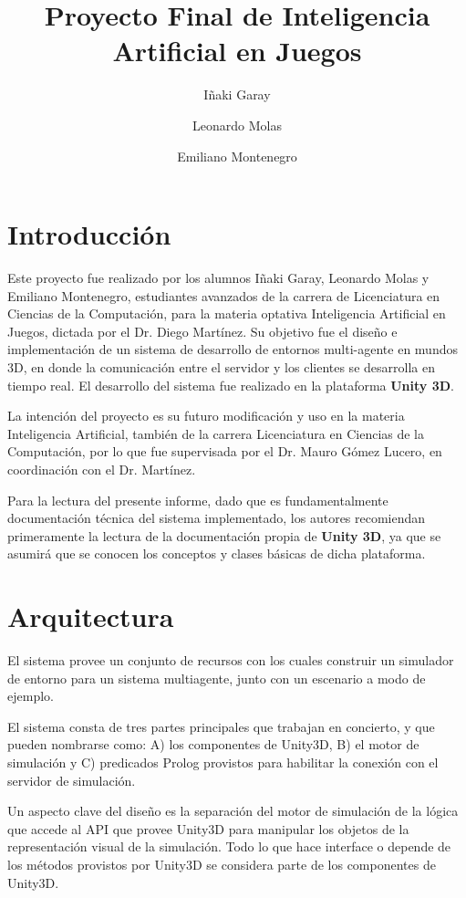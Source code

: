 \documentclass[a4paper,oneside]{article}
\title{Proyecto Final de Inteligencia Artificial en Juegos}
\author{Iñaki Garay \and Leonardo Molas \and Emiliano Montenegro}
\begin{document}
\maketitle

\section{Introducción}

Este proyecto fue realizado por los alumnos Iñaki Garay, Leonardo Molas
y Emiliano Montenegro, estudiantes avanzados de la carrera de Licenciatura en
Ciencias de la Computación, para la materia optativa Inteligencia Artificial en
Juegos, dictada por el Dr. Diego Martínez. 
Su objetivo fue el diseño e implementación de un sistema de desarrollo de
entornos multi-agente en mundos 3D, en donde la comunicación entre el servidor
y los clientes se desarrolla en tiempo real. El desarrollo del sistema fue
realizado en la plataforma
\textbf{Unity 3D}.

La intención del proyecto es su futuro modificación y uso en la materia
Inteligencia Artificial, también de la carrera Licenciatura en Ciencias de la
Computación, por lo que fue supervisada por el Dr. Mauro Gómez Lucero, en
coordinación con el Dr. Martínez.

Para la lectura del presente informe, dado que es fundamentalmente documentación
técnica del sistema implementado, los autores recomiendan primeramente la
lectura de la documentación propia de \textbf{Unity 3D}, ya que se asumirá que
se conocen los conceptos y clases básicas de dicha plataforma.

\section{Arquitectura}

El sistema provee un conjunto de recursos con los cuales construir un simulador
de entorno para un sistema multiagente, junto con un escenario a modo de ejemplo.

El sistema consta de tres partes principales que trabajan en concierto, y que
pueden nombrarse como: A) los componentes de Unity3D, B) el motor de
simulación y C) predicados Prolog provistos para habilitar la conexión con el 
servidor de simulación. 

Un aspecto clave del diseño es la separación del motor de simulación de la
lógica que accede al API que provee Unity3D para manipular los objetos de la
representación visual de la simulación.
Todo lo que hace interface o depende de los métodos provistos por Unity3D se 
considera parte de los componentes de Unity3D. 
\end{document}
